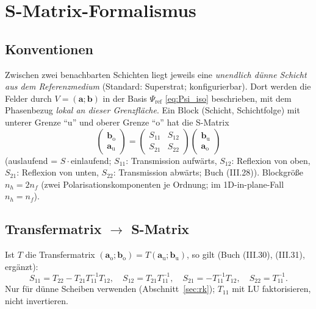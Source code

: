 \section{S-Matrix-Formalismus}\label{sec:smatrix}

\subsection{Konventionen}
Zwischen zwei benachbarten Schichten liegt jeweils eine \emph{unendlich dünne Schicht aus dem
Referenzmedium} (Standard: Superstrat; konfigurierbar). Dort werden die Felder durch
$V=(\mathbf a;\mathbf b)$ in der Basis $\Psi_{\text{ref}}$ \eqref{eq:Psi_iso} beschrieben, mit dem Phasenbezug
\emph{lokal an dieser Grenzfläche}. Ein Block (Schicht, Schichtfolge) mit unterer Grenze \enquote{u}
und oberer Grenze \enquote{o} hat die S-Matrix
\begin{equation}
  \begin{pmatrix}\mathbf b_{\text{o}}\\\mathbf a_{\text{u}}\end{pmatrix}=
  \begin{pmatrix}S_{11}&S_{12}\\S_{21}&S_{22}\end{pmatrix}
  \begin{pmatrix}\mathbf b_{\text{u}}\\\mathbf a_{\text{o}}\end{pmatrix}
  \label{eq:Sdef}
\end{equation}
(auslaufend = $S\cdot$einlaufend; $S_{11}$: Transmission aufwärts, $S_{12}$: Reflexion von oben,
$S_{21}$: Reflexion von unten, $S_{22}$: Transmission abwärts; Buch (III.28)). Blockgröße
$n_h=2n_f$ (zwei Polarisationskomponenten je Ordnung; im 1D-in-plane-Fall $n_h=n_f$).

\subsection{Transfermatrix $\to$ S-Matrix}
Ist $T$ die Transfermatrix $(\mathbf a_{\text{o}};\mathbf b_{\text{o}})=T(\mathbf a_{\text{u}};\mathbf b_{\text{u}})$, so gilt
(Buch (III.30), (III.31), ergänzt):
\begin{equation}
  S_{11}=T_{22}-T_{21}T_{11}^{-1}T_{12},\quad S_{12}=T_{21}T_{11}^{-1},\quad
  S_{21}=-T_{11}^{-1}T_{12},\quad S_{22}=T_{11}^{-1}.
  \label{eq:T2S}
\end{equation}
Nur für dünne Scheiben verwenden (Abschnitt~\ref{sec:rk}); $T_{11}$ mit LU faktorisieren, nicht invertieren.

